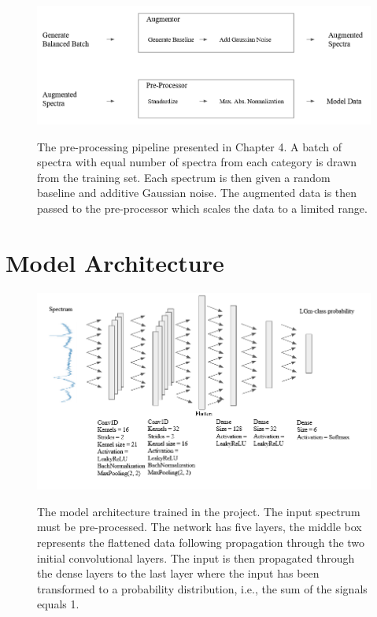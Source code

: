 \documentclass[a4paper, 12pt, oneside]{book}
\begin{document}
\begin{appendices}
\label{appendix:prep}


\begin{figure}[H]

    \centering
{\includegraphics[width=16cm]{images/preprocessing.png} }
\caption{The pre-processing pipeline presented in Chapter 4. A batch of spectra with equal number of spectra from each category is drawn from the training set. Each spectrum is then given a random baseline and additive Gaussian noise. The augmented data is then passed to the pre-processor which scales the data to a limited range.}

\end{figure}

\chapter{Model Architecture}

\label{appendix:model}

\begin{figure}[H]

    \centering
{\includegraphics[width=16cm]{images/model.png} }
\caption{The model architecture trained in the project. The input spectrum must be pre-processed. The network has five layers, the middle box represents the flattened data following propagation through the two initial convolutional layers. The input is then propagated through the dense layers to the last layer where the input has been transformed to a probability distribution, i.e., the sum of the signals equals 1.}

\end{figure}


\end{appendices}
\end{document}
